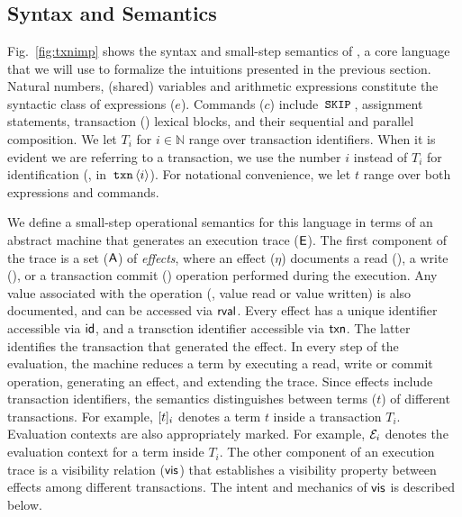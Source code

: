 \section{\txnimp}
\label{sec:opsem}



\subsection{Syntax and Semantics}
\label{sec:syntax}

Fig.~\ref{fig:txnimp} shows the syntax and small-step semantics of
\txnimp, a core language that we will use to formalize the intuitions
presented in the previous section. Natural numbers, (shared) variables
and arithmetic expressions constitute the syntactic class of
expressions ($e$).  Commands ($c$) include $\,{\tt SKIP}\,$, assignment
statements, transaction () lexical blocks, and their sequential
and parallel composition. We let $T_i$ for $i \in \mathbb{N}$ range
over transaction identifiers. When it is evident we are referring to a
transaction, we use the number $i$ instead of $T_i$ for identification
(\eg, in $\,{\tt txn}\,\langle i \rangle$). For notational convenience, we
let $t$ range over both expressions and commands.

We define a small-step operational semantics for this language in
terms of an abstract machine that generates an execution trace
($\textsf{E}$). The first component of the trace is a set ($\textsf{A}$) of
\emph{effects}, where an effect ($\eta$) documents a read (),
a write (), or a transaction commit () operation
performed during the execution. Any value associated with the
operation (\eg, value read or value written) is also documented, and
can be accessed via $\textsf{rval}$. Every effect has a unique identifier
accessible via $\textsf{id}$, and a transction identifier accessible via
$\textsf{txn}$.  The latter identifies the transaction that generated the
effect. In every step of the evaluation, the machine reduces a \txnimp
term by executing a read, write or commit operation, generating an
effect, and extending the trace. Since effects include transaction
identifiers, the semantics distinguishes between terms ($t$) of
different transactions. For example, $\lbrack t \rbrack_i$ denotes a term $t$
inside a transaction $T_i$.  Evaluation contexts are also
appropriately marked. For example, $\mathcal{E}_i$ denotes the evaluation
context for a term inside $T_i$. The other component of an execution
trace is a visibility relation ($\textsf{vis}$) that establishes a visibility
property between effects among different transactions. The intent and
mechanics of $\textsf{vis}$ is described below.

